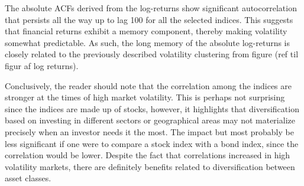 The absolute ACFs derived from the log-returns show significant autocorrelation that persists all the way up to lag 100 for all the selected indices. This suggests that financial returns exhibit a memory component, thereby making volatility somewhat predictable. As such, the long memory of the absolute log-returns is closely related to the previously described volatility clustering from figure (ref til figur af log returns).

Conclusively, the reader should note that the correlation among the indices are stronger at the times of high market volatility. This is perhaps not surprising since the indices are made up of stocks, however, it highlights that diversification based on investing in different sectors or geographical areas may not materialize precisely when an investor needs it the most. The impact but most probably be less significant if one were to compare a stock index with a bond index, since the correlation would be lower. Despite the fact that correlations increased in high volatility markets, there are definitely benefits related to diversification between asset classes.
